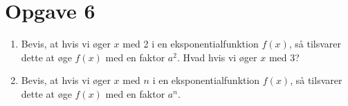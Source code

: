 \section*{Opgave 6}
\begin{enumerate}[label=\roman*)]
\item Bevis, at hvis vi øger $x$ med 2 i en eksponentialfunktion $f(x)$, så tilsvarer dette at øge $f(x)$ med en faktor $a^2$. Hvad hvis vi øger $x$ med $3$?
\item Bevis, at hvis vi øger $x$ med $n$ i en eksponentialfunktion $f(x)$, så tilsvarer dette at øge $f(x)$ med en faktor $a^n$.
\end{enumerate}
